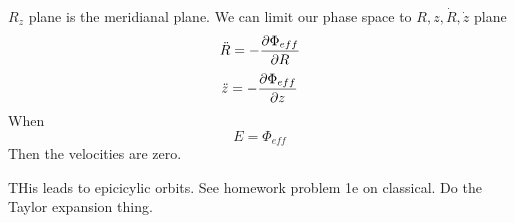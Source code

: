 $R_z$ plane is the meridianal plane. We can limit our phase space to $R, z, \dot{R}, \dot{z}$ plane
\begin{equation}
\ddot{R} = -\frac{\partial \Phi_{eff}}{\partial R} 
\end{equation}
\begin{equation}
\ddot{z} = -\frac{\partial \Phi_{eff}}{\partial z}
\end{equation}
When 
\begin{equation}
E = \Phi_{eff}
\end{equation}
Then the velocities are zero. 


THis leads to epicicylic orbits. See homework problem 1e on classical. Do the Taylor expansion thing. 



